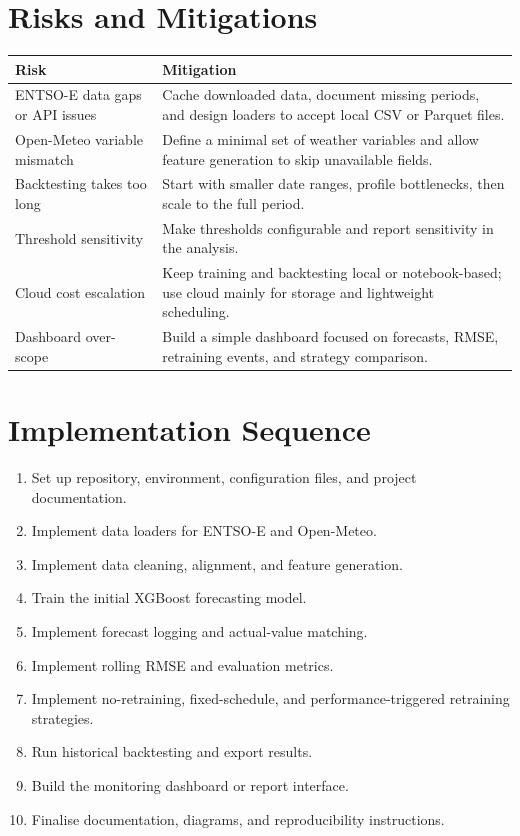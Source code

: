 \documentclass[12pt,a4paper]{article}
\begin{document}
\section{Risks and Mitigations}

\begin{longtable}{p{} p{}}
\hline
\textbf{Risk} & \textbf{Mitigation} \\
\hline
ENTSO-E data gaps or API issues & Cache downloaded data, document missing periods, and design loaders to accept local CSV or Parquet files. \\
Open-Meteo variable mismatch & Define a minimal set of weather variables and allow feature generation to skip unavailable fields. \\
Backtesting takes too long & Start with smaller date ranges, profile bottlenecks, then scale to the full period. \\
Threshold sensitivity & Make thresholds configurable and report sensitivity in the analysis. \\
Cloud cost escalation & Keep training and backtesting local or notebook-based; use cloud mainly for storage and lightweight scheduling. \\
Dashboard over-scope & Build a simple dashboard focused on forecasts, RMSE, retraining events, and strategy comparison. \\
\hline
\end{longtable}

\section{Implementation Sequence}

\begin{enumerate}
    \item Set up repository, environment, configuration files, and project documentation.
    \item Implement data loaders for ENTSO-E and Open-Meteo.
    \item Implement data cleaning, alignment, and feature generation.
    \item Train the initial XGBoost forecasting model.
    \item Implement forecast logging and actual-value matching.
    \item Implement rolling RMSE and evaluation metrics.
    \item Implement no-retraining, fixed-schedule, and performance-triggered retraining strategies.
    \item Run historical backtesting and export results.
    \item Build the monitoring dashboard or report interface.
    \item Finalise documentation, diagrams, and reproducibility instructions.
\end{enumerate}
\end{document}
